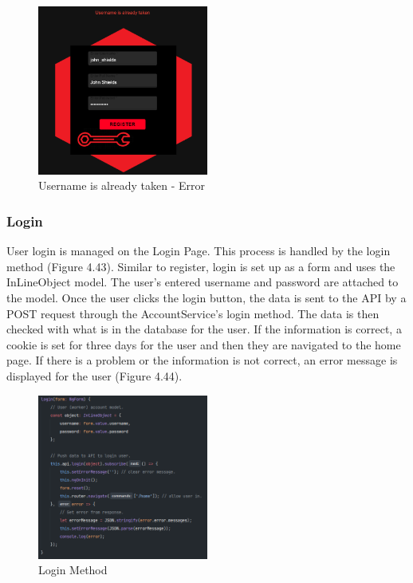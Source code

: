 \begin{figure}[H]
    \caption{Username is already taken - Error}
    \label{image:nameTaken}
    \centering
    \includegraphics[width=0.5\textwidth]{images/repota/UI/username_taken.png}
\end{figure}

\subsubsection{Login}
User login is managed on the Login Page. This process is handled by the login method (Figure 4.43). Similar to register, login is set up as a form and uses the InLineObject model. The user's entered username and password are attached to the model. Once the user clicks the login button, the data is sent to the API by a POST request through the AccountService's login method. The data is then checked with what is in the database for the user. If the information is correct, a cookie is set for three days for the user and then they are navigated to the home page. If there is a problem or the information is not correct, an error message is displayed for the user (Figure 4.44). 

\begin{figure}[H]
    \caption{Login Method}
    \label{image:loginMethod}
    \centering
    \includegraphics[width=0.5\textwidth]{images/repota/account_pages/login.png}
\end{figure}

